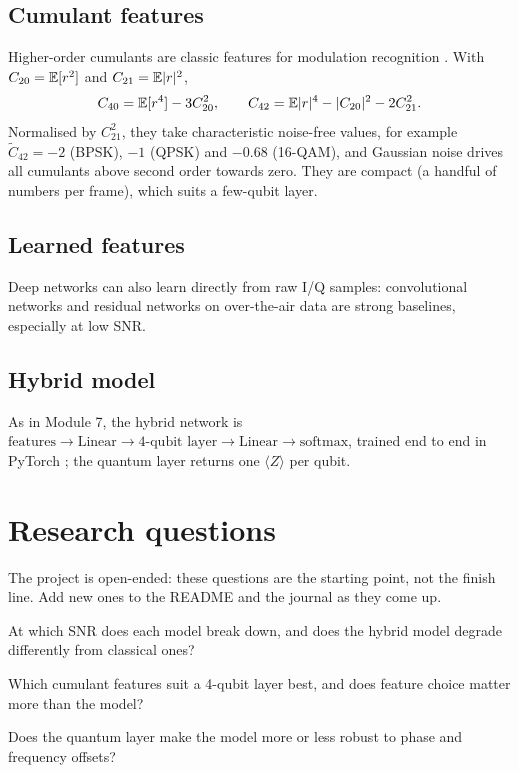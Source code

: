 \documentclass[11pt,a4paper]{article}
\begin{document}
\subsection{Cumulant features}
Higher-order cumulants are classic features for modulation recognition \citep{swami2000}. With
$C_{20}=\mathbb{E}[r^2]$ and $C_{21}=\mathbb{E}|r|^2$,
\begin{equation}
  C_{40}=\mathbb{E}[r^4]-3C_{20}^2,\qquad C_{42}=\mathbb{E}|r|^4-|C_{20}|^2-2C_{21}^2 .
\end{equation}
Normalised by $C_{21}^2$, they take characteristic noise-free values, for example $\tilde C_{42}=-2$
(BPSK), $-1$ (QPSK) and $-0.68$ (16-QAM), and Gaussian noise drives all cumulants above second order
towards zero. They are compact (a handful of numbers per frame), which suits a few-qubit layer.

\subsection{Learned features}
Deep networks can also learn directly from raw I/Q samples: convolutional networks \citep{oshea2016}
and residual networks on over-the-air data \citep{oshea2018} are strong baselines, especially at low SNR.

\subsection{Hybrid model}
As in Module 7, the hybrid network is
$\text{features}\to\text{Linear}\to\text{4-qubit layer}\to\text{Linear}\to\text{softmax}$, trained
end to end in PyTorch \citep{paszke2019}; the quantum layer returns one $\langle Z\rangle$ per qubit.

\section{Research questions}
The project is open-ended: these questions are the starting point, not the finish line. Add new
ones to the README and the journal as they come up.

\begin{rqlist}
  \item At which SNR does each model break down, and does the hybrid model degrade differently from classical ones?
  \item Which cumulant features suit a 4-qubit layer best, and does feature choice matter more than the model?
  \item Does the quantum layer make the model more or less robust to phase and frequency offsets?
\end{rqlist}
\end{document}
